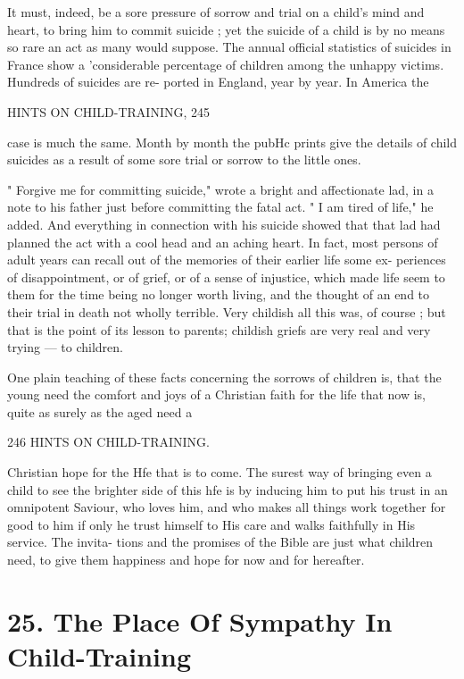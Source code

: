 \documentclass[
]{book}
\begin{document}
It must, indeed, be a sore pressure of sorrow and trial on a child's mind and heart, to bring him to commit suicide ; yet the suicide of a child is by no means so rare an act as many would suppose. The annual official statistics of suicides in France show a 'considerable percentage of children among the unhappy victims. Hundreds of suicides are re- ported in England, year by year. In America the

HINTS ON CHILD-TRAINING, 245

case is much the same. Month by month the pubHc prints give the details of child suicides as a result of some sore trial or sorrow to the little ones.

" Forgive me for committing suicide," wrote a bright and affectionate lad, in a note to his father just before committing the fatal act. " I am tired of life," he added. And everything in connection with his suicide showed that that lad had planned the act with a cool head and an aching heart. In fact, most persons of adult years can recall out of the memories of their earlier life some ex- periences of disappointment, or of grief, or of a sense of injustice, which made life seem to them for the time being no longer worth living, and the thought of an end to their trial in death not wholly terrible. Very childish all this was, of course ; but that is the point of its lesson to parents; childish griefs are very real and very trying --- to children.

One plain teaching of these facts concerning the sorrows of children is, that the young need the comfort and joys of a Christian faith for the life that now is, quite as surely as the aged need a

246 HINTS ON CHILD-TRAINING.

Christian hope for the Hfe that is to come. The surest way of bringing even a child to see the brighter side of this hfe is by inducing him to put his trust in an omnipotent Saviour, who loves him, and who makes all things work together for good to him if only he trust himself to His care and walks faithfully in His service. The invita- tions and the promises of the Bible are just what children need, to give them happiness and hope for now and for hereafter.

\hypertarget{the-place-of-sympathy-in-child-training}{%
\chapter{25. The Place Of Sympathy In Child-Training}\label{the-place-of-sympathy-in-child-training}}
\end{document}

